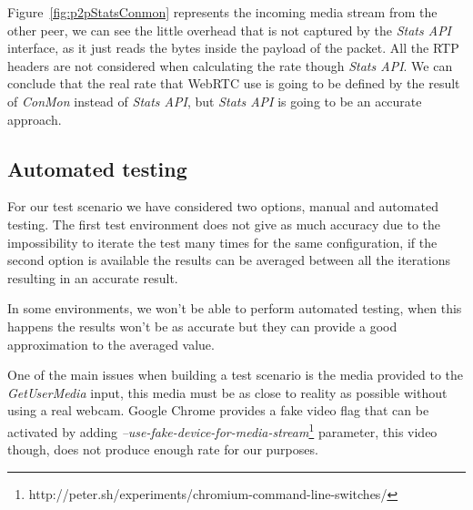 Figure~\ref{fig:p2pStatsConmon} represents the incoming media stream from the other peer, we can see the little overhead that is not captured by the {\it Stats API} interface, as it just reads the bytes inside the payload of the packet. All the RTP headers are not considered when calculating the rate though {\it Stats API}. We can conclude that the real rate that WebRTC use is going to be defined by the result of {\it ConMon} instead of {\it Stats API}, but {\it Stats API} is going to be an accurate approach.

\subsection{Automated testing}

For our test scenario we have considered two options, manual and automated testing. The first test environment does not give as much accuracy due to the impossibility to iterate the test many times for the same configuration, if the second option is available the results can be averaged between all the iterations resulting in an accurate result.

In some environments, we won't be able to perform automated testing, when this happens the results won't be as accurate but they can provide a good approximation to the averaged value.

One of the main issues when building a test scenario is the media provided to the {\it GetUserMedia} input, this media must be as close to reality as possible without using a real webcam. Google Chrome provides a fake video flag that can be activated by adding {\it --use-fake-device-for-media-stream}\footnote{http://peter.sh/experiments/chromium-command-line-switches/} parameter, this video though, does not produce enough rate for our purposes.


